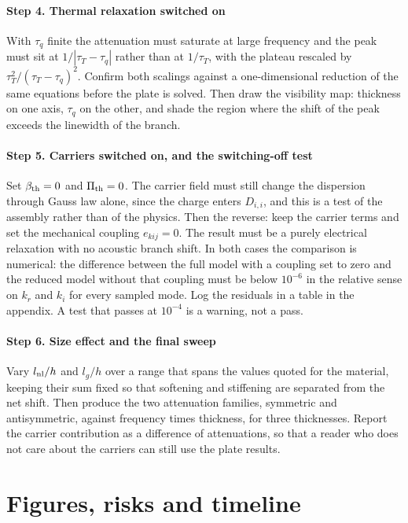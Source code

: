 \documentclass[11pt]{article}
\begin{document}
\paragraph{Step 4. Thermal relaxation switched on} With $\tau_q$ finite the attenuation must saturate at
large frequency and the peak must sit at $1/|\tau_T-\tau_q|$ rather than at $1/\tau_T$, with the plateau
rescaled by $\tau_T^2/(\tau_T-\tau_q)^2$. Confirm both scalings against a one-dimensional reduction of the
same equations before the plate is solved. Then draw the visibility map: thickness on one axis, $\tau_q$ on
the other, and shade the region where the shift of the peak exceeds the linewidth of the branch.

\paragraph{Step 5. Carriers switched on, and the switching-off test} Set $\beta_{\rm th}=0$ and $\Pi_{\rm th}=0$.
The carrier field must still change the dispersion through Gauss law alone, since the charge enters
$D_{i,i}$, and this is a test of the assembly rather than of the physics. Then the reverse: keep the
carrier terms and set the mechanical coupling $e_{kij}=0$. The result must be a purely electrical
relaxation with no acoustic branch shift. In both cases the comparison is numerical: the difference between
the full model with a coupling set to zero and the reduced model without that coupling must be below
$10^{-6}$ in the relative sense on $k_r$ and $k_i$ for every sampled mode. Log the residuals in a table in
the appendix. A test that passes at $10^{-4}$ is a warning, not a pass.

\paragraph{Step 6. Size effect and the final sweep} Vary $l_{\rm nl}/h$ and $l_g/h$ over a range that spans
the values quoted for the material, keeping their sum fixed so that softening and stiffening are separated
from the net shift. Then produce the two attenuation families, symmetric and antisymmetric, against
frequency times thickness, for three thicknesses. Report the carrier contribution as a difference of
attenuations, so that a reader who does not care about the carriers can still use the plate results.

\section{Figures, risks and timeline}
\end{document}
